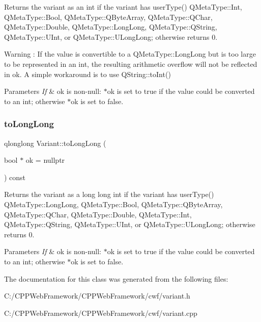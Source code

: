 Returns the variant as an int if the variant has user\+Type() Q\+Meta\+Type\+::\+Int, Q\+Meta\+Type\+::\+Bool, Q\+Meta\+Type\+::\+Q\+Byte\+Array, Q\+Meta\+Type\+::\+Q\+Char, Q\+Meta\+Type\+::\+Double, Q\+Meta\+Type\+::\+Long\+Long, Q\+Meta\+Type\+::\+Q\+String, Q\+Meta\+Type\+::\+U\+Int, or Q\+Meta\+Type\+::\+U\+Long\+Long; otherwise returns 0. 

\begin{DoxyWarning}{Warning}
\+: If the value is convertible to a Q\+Meta\+Type\+::\+Long\+Long but is too large to be represented in an int, the resulting arithmetic overflow will not be reflected in ok. A simple workaround is to use Q\+String\+::to\+Int() 
\end{DoxyWarning}

\begin{DoxyParams}{Parameters}
{\em If} & ok is non-\/null\+: $\ast$ok is set to true if the value could be converted to an int; otherwise $\ast$ok is set to false. \\
\hline
\end{DoxyParams}
\mbox{\label{class_variant_ad6c7084a71cb3189d302160a160bb36b}} 
\subsubsection{\texorpdfstring{to\+Long\+Long}{toLongLong}}
{\footnotesize\ttfamily qlonglong Variant\+::to\+Long\+Long (\begin{DoxyParamCaption}\item[{bool $\ast$}]{ok = {\ttfamily nullptr} }\end{DoxyParamCaption}) const\hspace{0.3cm}{\ttfamily [slot]}}



Returns the variant as a long long int if the variant has user\+Type() Q\+Meta\+Type\+::\+Long\+Long, Q\+Meta\+Type\+::\+Bool, Q\+Meta\+Type\+::\+Q\+Byte\+Array, Q\+Meta\+Type\+::\+Q\+Char, Q\+Meta\+Type\+::\+Double, Q\+Meta\+Type\+::\+Int, Q\+Meta\+Type\+::\+Q\+String, Q\+Meta\+Type\+::\+U\+Int, or Q\+Meta\+Type\+::\+U\+Long\+Long; otherwise returns 0. 


\begin{DoxyParams}{Parameters}
{\em If} & ok is non-\/null\+: $\ast$ok is set to true if the value could be converted to an int; otherwise $\ast$ok is set to false. \\
\hline
\end{DoxyParams}


The documentation for this class was generated from the following files\+:\begin{DoxyCompactItemize}
\item 
C\+:/\+C\+P\+P\+Web\+Framework/\+C\+P\+P\+Web\+Framework/cwf/variant.\+h\item 
C\+:/\+C\+P\+P\+Web\+Framework/\+C\+P\+P\+Web\+Framework/cwf/variant.\+cpp\end{DoxyCompactItemize}
